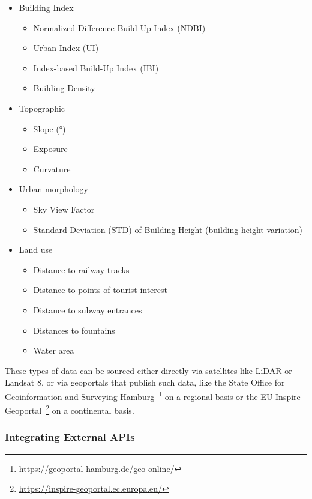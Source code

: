 \begin{itemize}
    \item Building Index
    \begin{itemize}
        \item Normalized Difference Build-Up Index (NDBI)
        \item Urban Index (UI)
        \item Index-based Build-Up Index (IBI)
        \item Building Density
    \end{itemize}
    \item Topographic
    \begin{itemize}
        \item Slope (°)
        \item Exposure
        \item Curvature
    \end{itemize}
    \item Urban morphology
    \begin{itemize}
        \item Sky View Factor
        \item Standard Deviation (STD) of Building Height (building height variation)
    \end{itemize}
    \item Land use
    \begin{itemize}
        \item Distance to railway tracks
        \item Distance to points of tourist interest
        \item Distance to subway entrances
        \item Distances to fountains
        \item Water area
    \end{itemize}
\end{itemize}

These types of data can be sourced either directly via satellites like LiDAR or Landsat 8, or via geoportals that publish such data, like the State Office for Geoinformation and Surveying Hamburg~\footnote{\url{https://geoportal-hamburg.de/geo-online/}} on a regional basis or the EU Inspire Geoportal~\footnote{\url{https://inspire-geoportal.ec.europa.eu/}} on a continental basis.

\subsubsection{Integrating External APIs}

